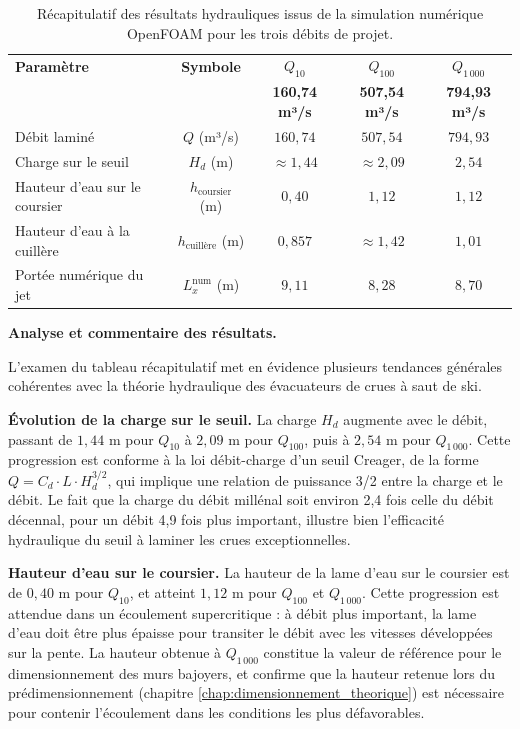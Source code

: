 \begin{table}[H]
\centering
\caption{Récapitulatif des résultats hydrauliques issus de la simulation numérique OpenFOAM pour les trois débits de projet.}
\label{tab:recapitulatif_resultats}
\renewcommand{\arraystretch}{1.4}
\begin{tabular}{lcccc}
\toprule
\textbf{Paramètre} & \textbf{Symbole} & \textbf{$Q_{10}$} & \textbf{$Q_{100}$} & \textbf{$Q_{1\,000}$} \\
 & & \textbf{160,74 m³/s} & \textbf{507,54 m³/s} & \textbf{794,93 m³/s} \\
\midrule
Débit laminé & $Q$ (m³/s) & $160{,}74$ & $507{,}54$ & $794{,}93$ \\
\midrule
Charge sur le seuil & $H_d$ (m) & $\approx 1{,}44$ & $\approx 2{,}09$ & $2{,}54$ \\
Hauteur d'eau sur le coursier & $h_{\text{coursier}}$ (m) & $0{,}40$ & $1{,}12$ & $1{,}12$ \\
Hauteur d'eau à la cuillère & $h_{\text{cuillère}}$ (m) & $0{,}857$ & $\approx 1{,}42$ & $1{,}01$ \\
\midrule
Portée numérique du jet & $L_x^{\text{num}}$ (m) & $9{,}11$ & $8{,}28$ & $8{,}70$ \\
\bottomrule
\end{tabular}
\end{table}

\textbf{Analyse et commentaire des résultats.}

L'examen du tableau récapitulatif met en évidence plusieurs tendances générales cohérentes avec la théorie hydraulique des évacuateurs de crues à saut de ski.

\medskip
\noindent\textbf{Évolution de la charge sur le seuil.} La charge $H_d$ augmente avec le débit, passant de $1{,}44$ m pour $Q_{10}$ à $2{,}09$ m pour $Q_{100}$, puis à $2{,}54$ m pour $Q_{1\,000}$. Cette progression est conforme à la loi débit-charge d'un seuil Creager, de la forme $Q = C_d \cdot L \cdot H_d^{3/2}$, qui implique une relation de puissance 3/2 entre la charge et le débit. Le fait que la charge du débit millénal soit environ 2,4 fois celle du débit décennal, pour un débit 4,9 fois plus important, illustre bien l'efficacité hydraulique du seuil à laminer les crues exceptionnelles.

\medskip
\noindent\textbf{Hauteur d'eau sur le coursier.} La hauteur de la lame d'eau sur le coursier est de $0{,}40$ m pour $Q_{10}$, et atteint $1{,}12$ m pour $Q_{100}$ et $Q_{1\,000}$. Cette progression est attendue dans un écoulement supercritique : à débit plus important, la lame d'eau doit être plus épaisse pour transiter le débit avec les vitesses développées sur la pente. La hauteur obtenue à $Q_{1\,000}$ constitue la valeur de référence pour le dimensionnement des murs bajoyers, et confirme que la hauteur retenue lors du prédimensionnement (chapitre \ref{chap:dimensionnement_theorique}) est nécessaire pour contenir l'écoulement dans les conditions les plus défavorables.

